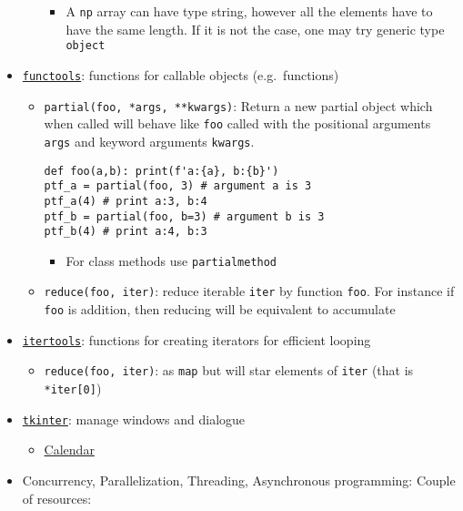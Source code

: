 \documentclass[a4paper,12pt,%
              final%
              ]{article}
\begin{document}
\begin{itemize}
\begin{itemize}
\begin{itemize}
          \item A \texttt{np} array can have type string, however all the elements have to have the same length. If it is not the case, one may try generic type \texttt{object}
        \end{itemize}
    \end{itemize}
  \item \href{https://docs.python.org/3/library/functools.html}{\texttt{functools}}: functions for callable objects (e.g.~functions)
    \begin{itemize}
      \item \verb|partial(foo, *args, **kwargs)|: Return a new partial object which when called will behave like \texttt{foo} called with the positional arguments \texttt{args} and keyword arguments \texttt{kwargs}.
\begin{verbatim}
def foo(a,b): print(f'a:{a}, b:{b}')
ptf_a = partial(foo, 3) # argument a is 3
ptf_a(4) # print a:3, b:4
ptf_b = partial(foo, b=3) # argument b is 3
ptf_b(4) # print a:4, b:3
\end{verbatim}
        \begin{itemize}
          \item For class methods use \texttt{partialmethod}
        \end{itemize}
      \item \verb|reduce(foo, iter)|: reduce iterable \texttt{iter} by function \texttt{foo}. For instance if \texttt{foo} is addition, then reducing will be equivalent to accumulate
    \end{itemize}
  \item \href{https://docs.python.org/3/library/itertools.html}{\texttt{itertools}}: functions for creating iterators for efficient looping
    \begin{itemize}
      \item \verb|reduce(foo, iter)|: as \texttt{map} but will star elements of \texttt{iter} (that is \verb|*iter[0]|)
    \end{itemize}
  \item \href{https://docs.python.org/3/library/tkinter.html}{\texttt{tkinter}}: manage windows and dialogue
    \begin{itemize}
      \item \href{https://tkcalendar.readthedocs.io/en/stable/index.html}{Calendar}
    \end{itemize}
  \item Concurrency, Parallelization, Threading, Asynchronous programming: Couple of resources:

\end{itemize}
\end{document}
